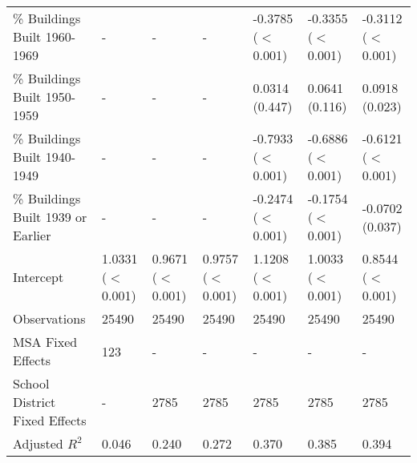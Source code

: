 \begin{table}[h]
\begin{tabular}{l|llllll}
\% Buildings Built 1960-1969 &- & - & - & -0.3785 ($<$0.001) & -0.3355 ($<$0.001) & -0.3112 ($<$0.001) \\
\% Buildings Built 1950-1959 &- & - & - & 0.0314 (0.447) & 0.0641 (0.116) & 0.0918 (0.023) \\
\% Buildings Built 1940-1949 &- & - & - & -0.7933 ($<$0.001) & -0.6886 ($<$0.001) & -0.6121 ($<$0.001) \\
\% Buildings Built 1939 or Earlier &- & - & - & -0.2474 ($<$0.001) & -0.1754 ($<$0.001) & -0.0702 (0.037) \\
Intercept &1.0331 ($<$0.001) & 0.9671 ($<$0.001) & 0.9757 ($<$0.001) & 1.1208 ($<$0.001) & 1.0033 ($<$0.001) & 0.8544 ($<$0.001) \\
Observations &25490 & 25490 & 25490 & 25490 & 25490 & 25490 \\
MSA Fixed Effects &123 & - & - & - & - & - \\
School District Fixed Effects &- & 2785 & 2785 & 2785 & 2785 & 2785 \\
Adjusted $R^2$ &0.046 & 0.240 & 0.272 & 0.370 & 0.385 & 0.394 \\\hline
\end{tabular}
\end{table}
